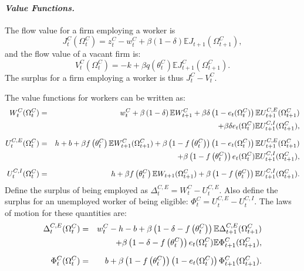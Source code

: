 \documentclass[12pt]{article}
\newcommand{\1}{\mathbf{1}}
\newcommand{\E}{\mathbb{E}}
\newcommand{\zct}{z^C_t}
\newcommand{\tct}{\theta^C_t}
\newcommand{\oct}{\Omega^C_t}
\begin{document}
\begin{appendix}
\vspace{-0.3cm}\paragraph{\textit{Value Functions.}}
The flow value for a firm employing a worker is
\begin{equation}
J^C_t(\oct) = \zct-w^C_t+\beta\left(1-\delta\right)\E J_{t+1}(\Omega^C_{t+1}) \label{TJC},
\end{equation}
and the flow value of a vacant firm is:
\begin{equation}
V^C_t(\oct)=-k+\beta q\left(\tct\right)\E J^C_{t+1}(\Omega^C_{t+1}).
\label{TFEC}
\end{equation}
The surplus for a firm employing a worker is thus $J^C_t-V^C_t$.

The value functions for workers can be written as:
\begin{eqnarray}
W^C_t(\oct) &=& w^C_t +\beta\left(1-\delta\right)\E W^C_{t+1} + \beta\delta\left(1-e_t(\oct)\right) \E U_{t+1}^{C,E}(\Omega^C_{t+1}) \notag \\
&& +\beta\delta e_t(\oct) \E U_{t+1}^{C,I}(\Omega^C_{t+1}),  \label{TWC} \\[2mm]
U^{C,E}_t(\oct) &=& h+b +\beta f\left(\tct\right)\E W^C_{t+1}(\Omega^C_{t+1})  +\beta\left(1-f\left(\tct\right)\right)\left(1-e_t(\oct)\right)\E U_{t+1}^{C,E}(\Omega^C_{t+1})\notag \\
&&   +\beta\left(1-f\left(\tct\right)\right)e_t(\oct) \E U_{t+1}^{C,I}(\Omega^C_{t+1}),  \label{TUEC} \\[2mm]
U^{C,I}_t(\oct) &=& h+\beta f\left(\tct\right)\E W_{t+1}(\Omega^C_{t+1}) + \beta\left(1-f\left(\tct\right)\right)\E U_{t+1}^{C,I}(\Omega^C_{t+1}). \label{TUIC}
\end{eqnarray}
Define the surplus of being employed as $\Delta_t^{C,E}=W^C_t-U_t^{C,E}$. Also define the surplus for an unemployed worker of being eligible: $\Phi^C_t=U_t^{C,E}-U_t^{C,I}$. The laws of motion for these quantities are:
\begin{eqnarray}
\Delta_t^{C,E}(\oct)&=&w^C_t-h-b+\beta\left(1-\delta-f\left(\tct\right)\right)\E \Delta_{t+1}^{C,E}(\Omega^C_{t+1})  \notag \\
&& +\beta\left(1-\delta-f\left(\tct\right)\right)e_t(\oct)\E\Phi^C_{t+1}(\Omega^C_{t+1}),
 \label{TDeltaC}\\[2mm]
\Phi^C_t(\oct)&=&b+\beta\left(1-f\left(\tct\right)\right)\left(1-e_t(\oct)\right)\Phi^C_{t+1}(\Omega^C_{t+1}). \label{TPhiC}
\end{eqnarray}


\end{appendix}
\end{document}
